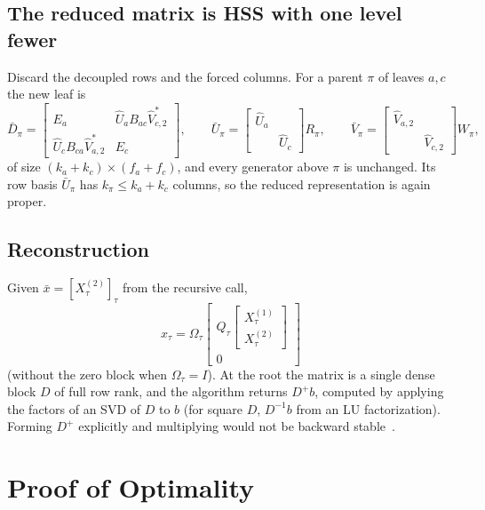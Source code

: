 \subsection{The reduced matrix is HSS with one level fewer}\label{subsec:merge}
Discard the decoupled rows and the forced columns. For a parent $\pi$ of leaves $a,c$ the new leaf is
\begin{equation}\label{eq:merge}
\bar D_\pi=\begin{bmatrix}E_a & \hat U_aB_{ac}\hat V_{c,2}^*\\ \hat U_cB_{ca}\hat V_{a,2}^* & E_c\end{bmatrix},\qquad
\bar U_\pi=\begin{bmatrix}\hat U_a&\\&\hat U_c\end{bmatrix}R_\pi,\qquad
\bar V_\pi=\begin{bmatrix}\hat V_{a,2}&\\&\hat V_{c,2}\end{bmatrix}W_\pi,
\end{equation}
of size $(k_a+k_c)\times(f_a+f_c)$, and every generator above $\pi$ is unchanged. Its row basis
$\bar U_\pi$ has $k_\pi\le k_a+k_c$ columns, so the reduced representation is again proper.

\subsection{Reconstruction}\label{subsec:reconstruction}
Given $\bar x=[X^{(2)}_\tau]_\tau$ from the recursive call,
\[
x_\tau=\Omega_\tau\begin{bmatrix}Q_\tau\begin{bmatrix}X^{(1)}_\tau\\X^{(2)}_\tau\end{bmatrix}\\0\end{bmatrix}
\]
(without the zero block when $\Omega_\tau=I$). At the root the matrix is a single dense block $D$ of
full row rank, and the algorithm returns $D^+b$, computed by applying the factors of an SVD of $D$ to
$b$ (for square $D$, $D^{-1}b$ from an LU factorization). Forming $D^+$ explicitly and multiplying would
not be backward stable~\cite{higham}.

\section{Proof of Optimality}
\label{sec:proof}

